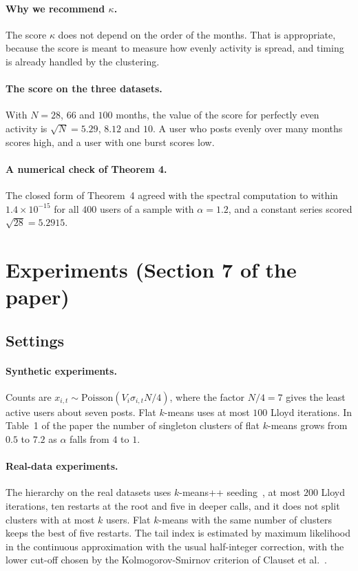 \documentclass[11pt]{article}
\theoremstyle{remark}\newtheorem{remark}{Remark}\renewcommand{\theremark}{S\arabic{remark}}
\begin{document}
\paragraph{Why we recommend $\kappa$.} The score $\kappa$ does not depend on the order of the months. That is appropriate, because the score is meant to measure how evenly activity is spread, and timing is already handled by the clustering.

\paragraph{The score on the three datasets.} With $N=28$, $66$ and $100$ months, the value of the score for perfectly even activity is $\sqrt N=5.29$, $8.12$ and $10$. A user who posts evenly over many months scores high, and a user with one burst scores low.

\paragraph{A numerical check of Theorem 4.} The closed form of Theorem~4 agreed with the spectral computation to within $1.4\times10^{-15}$ for all $400$ users of a sample with $\alpha=1.2$, and a constant series scored $\sqrt{28}=5.2915$.

\section{Experiments (Section 7 of the paper)}\label{s:experiments}

\subsection*{Settings}
\paragraph{Synthetic experiments.} Counts are $x_{i,t}\sim\mathrm{Poisson}(V_i\sigma_{i,t}N/4)$, where the factor $N/4=7$ gives the least active users about seven posts. Flat $k$-means uses at most $100$ Lloyd iterations. In Table~1 of the paper the number of singleton clusters of flat $k$-means grows from $0.5$ to $7.2$ as $\alpha$ falls from $4$ to $1$.

\paragraph{Real-data experiments.} The hierarchy on the real datasets uses $k$-means++ seeding~\cite{arthur2007kmeanspp}, at most $200$ Lloyd iterations, ten restarts at the root and five in deeper calls, and it does not split clusters with at most $k$ users. Flat $k$-means with the same number of clusters keeps the best of five restarts. The tail index is estimated by maximum likelihood in the continuous approximation with the usual half-integer correction, with the lower cut-off chosen by the Kolmogorov-Smirnov criterion of Clauset et al.~\cite{clauset2009power}.
\end{document}
